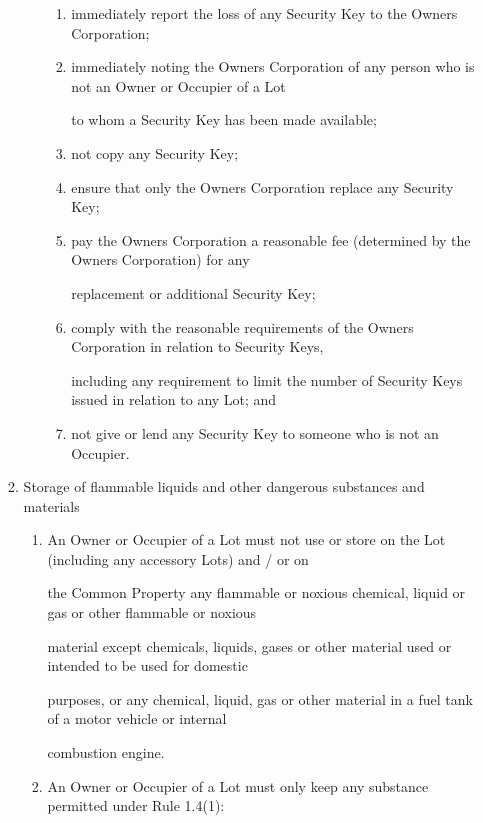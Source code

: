 \documentclass{article}
\begin{document}
\begin{enumerate}[label=\arabic*.]
\begin{enumerate}[label=\arabic{enumi}.\arabic*.]
\begin{enumerate}[label=(\arabic*)]
\begin{enumerate}[label=(\alph*)]
\item  immediately report the loss of any Security Key to the Owners Corporation; 

\item  immediately noting the Owners Corporation of any person who is not an Owner or Occupier of a Lot 

to whom a Security Key has been made available; 

\item  not copy any Security Key; 

\item  ensure that only the Owners Corporation replace any Security Key; 

\item  pay the Owners Corporation a reasonable fee (determined by the Owners Corporation) for any 

replacement or additional Security Key; 

\item  comply with the reasonable requirements of the Owners Corporation in relation to Security Keys, 

including any requirement to limit the number of Security Keys issued in relation to any Lot; and 

\item  not give or lend any Security Key to someone who is not an Occupier. 

\newpage

\end{enumerate}
\end{enumerate}
\item  Storage of flammable liquids and other dangerous substances and materials 

\begin{enumerate}[label=(\arabic*)]
\item  An Owner or Occupier of a Lot must not use or store on the Lot (including any accessory Lots) and / or on 

the Common Property any flammable or noxious chemical, liquid or gas or other flammable or noxious 

material except chemicals, liquids, gases or other material used or intended to be used for domestic 

purposes, or any chemical, liquid, gas or other material in a fuel tank of a motor vehicle or internal 

combustion engine. 

\item  An Owner or Occupier of a Lot must only keep any substance permitted under Rule 1.4(1): 


\end{enumerate}
\end{enumerate}
\end{enumerate}
\end{document}
